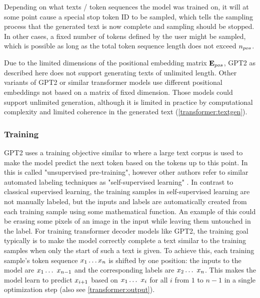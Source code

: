 Depending on what texts / token sequences the model was trained on, it will at some point cause a special stop token ID to be sampled, which tells the sampling process that the generated text is now complete and sampling should be stopped.
In other cases, a fixed number of tokens defined by the user might be sampled, which is possible as long as the total token sequence length does not exceed ${n_{pos}}$.

Due to the limited dimensions of the positional embedding matrix ${\mathbf{E}_{pos}}$, GPT2 as described here does not support generating texts of unlimited length. Other variants of GPT2 or similar transformer models use different positional embeddings not based on a matrix of fixed dimension. Those models could support unlimited generation, although it is limited in practice by computational complexity and limited coherence in the generated text (\cref{transformer:textgen}).


\subsubsection{Training}
\label{gpt2:training}

GPT2 uses a training objective similar to  where a large text corpus is used to make the model predict the next token based on the tokens up to this point.
In \cite{improvinglu} this is called "unsupervised pre-training", however other authors refer to similar automated labeling techniques as "self-supervised learning" \cite{selfsupervised} \cite{selfsupervisedvisual}.
In contrast to classical supervised learning, the training samples in self-supervised learning are not manually labeled, but the inputs and labels are automatically created from each training sample using some mathematical function. An example of this could be erasing some pixels of an image in the input while leaving them untouched in the label.
For training transformer decoder models like GPT2, the training goal typically is to make the model correctly complete a text similar to the training samples when only the start of such a text is given.
To achieve this, each training sample's token sequence ${x}_1 \ldots {x}_n$ is shifted by one position: the inputs to the model are $\modIn_1 \ldots \modIn_{n-1}$ and the corresponding labels are $\modIn_2 \ldots \modIn_n$. This makes the model learn to predict ${x}_{i+1}$ based on $\modIn_1 \ldots \modIn_i$ for all $i$ from $1$ to $n-1$ in a single optimization step (also see \cref{transformer:output}).

